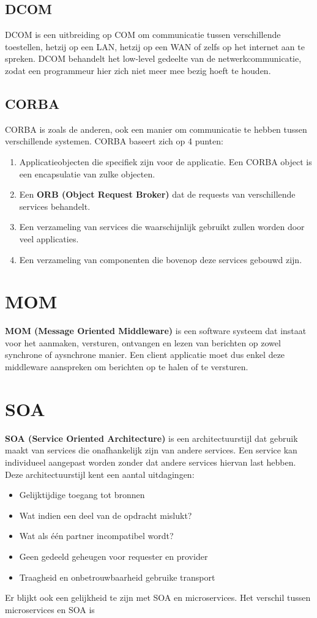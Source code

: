 \documentclass{report}
\begin{document}
\subsection{DCOM}
DCOM is een uitbreiding op COM om communicatie tussen verschillende toestellen, hetzij op een LAN, hetzij op een WAN of zelfs op het internet aan te spreken. DCOM behandelt het low-level gedeelte van de netwerkcommunicatie, zodat een programmeur hier zich niet meer mee bezig hoeft te houden.  
\subsection{CORBA}
CORBA is zoals de anderen, ook een manier om communicatie te hebben tussen verschillende systemen. CORBA baseert zich op 4 punten:
\begin{enumerate}
	\item Applicatieobjecten die specifiek zijn voor de applicatie. Een CORBA object is een encapsulatie van zulke objecten.
	\item Een \textbf{ORB (Object Request Broker)} dat de requests van verschillende services behandelt. 
	\item Een verzameling van services die waarschijnlijk gebruikt zullen worden door veel applicaties. 
	\item Een verzameling van componenten die bovenop deze services gebouwd zijn.
\end{enumerate} 


\section{MOM}
\textbf{MOM (Message Oriented Middleware)} is een software systeem dat instaat voor het aanmaken, versturen, ontvangen en lezen van berichten op zowel synchrone of aysnchrone manier. Een client applicatie moet dus enkel deze middleware aanspreken om berichten op te halen of te versturen.

\section{SOA}
\textbf{SOA (Service Oriented Architecture)} is een architectuurstijl dat gebruik maakt van services die onafhankelijk zijn van andere services. Een service kan individueel aangepast worden zonder dat andere services hiervan last hebben. Deze architectuurstijl kent een aantal uitdagingen:
\begin{itemize}
	\item Gelijktijdige toegang tot bronnen
	\item Wat indien een deel van de opdracht mislukt?
	\item Wat als één partner incompatibel wordt?
	\item Geen gedeeld geheugen voor requester en provider
	\item Traagheid en onbetrouwbaarheid gebruike transport
\end{itemize}
Er blijkt ook een gelijkheid te zijn met SOA en microservices. Het verschil tussen microservices en SOA is 
\end{document}
